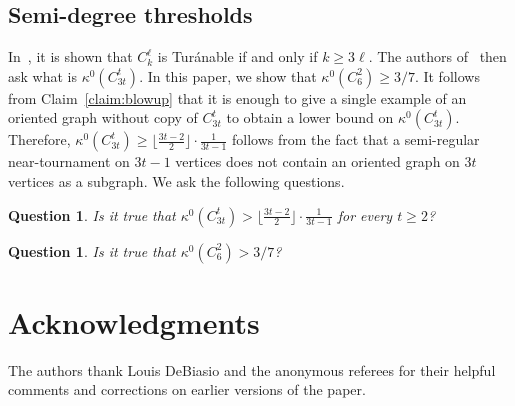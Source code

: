 \documentclass[11pt]{amsart}
\newtheorem{question}[theorem]{Question}
\begin{document}
\subsection{Semi-degree thresholds}
In~\cite{DHLMPT}, it is shown that $C_{k}^\ell$ is Tur\'anable if and only if $k \ge 3\ell$. 
The authors of~\cite{DHLMPT} then ask what is $\kappa^0(C_{3t}^t)$.
In this paper, we show that $\kappa^0(C_{6}^2) \ge 3/7$.
It follows from Claim~\ref{claim:blowup} that it is enough to give a single example of an oriented graph without copy of $C_{3t}^t$ to obtain a lower bound on $\kappa^0(C_{3t}^t)$. 
Therefore, $\kappa^0(C_{3t}^t) \ge \lfloor \frac{3t-2}{2} \rfloor \cdot \frac{1}{3t-1}$ follows from the fact that a semi-regular near-tournament on $3t-1$ vertices does not contain an oriented graph on $3t$ vertices as a subgraph.
We ask the following questions.

\begin{question}
    Is it true that $\kappa^0(C_{3t}^t) > \lfloor \frac{3t-2}{2} \rfloor \cdot \frac{1}{3t-1}$ for every $t \ge 2$?
\end{question}

\begin{question}
    Is it true that $\kappa^0(C_{6}^2) > 3/7$?
\end{question}

\section*{Acknowledgments}

The authors thank Louis DeBiasio and the anonymous referees for their helpful comments and corrections on earlier versions of the paper.
\end{document}
